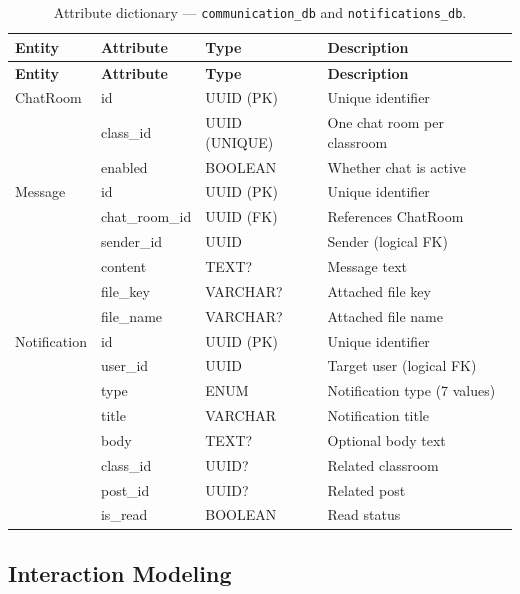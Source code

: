 \begin{longtable}{@{} l l l p{5.5cm} @{}}
  \caption{Attribute dictionary --- \texttt{communication\_db} and \texttt{notifications\_db}.} \label{tab:dict-comm-notif} \\
  \toprule
  \textbf{Entity} & \textbf{Attribute} & \textbf{Type} & \textbf{Description} \\
  \midrule
  \endfirsthead
  \toprule
  \textbf{Entity} & \textbf{Attribute} & \textbf{Type} & \textbf{Description} \\
  \midrule
  \endhead
  ChatRoom & id & UUID (PK) & Unique identifier \\
           & class\_id & UUID (UNIQUE) & One chat room per classroom \\
           & enabled & BOOLEAN & Whether chat is active \\
  \midrule
  Message & id & UUID (PK) & Unique identifier \\
          & chat\_room\_id & UUID (FK) & References ChatRoom \\
          & sender\_id & UUID & Sender (logical FK) \\
          & content & TEXT? & Message text \\
          & file\_key & VARCHAR? & Attached file key \\
          & file\_name & VARCHAR? & Attached file name \\
  \midrule
  Notification & id & UUID (PK) & Unique identifier \\
               & user\_id & UUID & Target user (logical FK) \\
               & type & ENUM & Notification type (7 values) \\
               & title & VARCHAR & Notification title \\
               & body & TEXT? & Optional body text \\
               & class\_id & UUID? & Related classroom \\
               & post\_id & UUID? & Related post \\
               & is\_read & BOOLEAN & Read status \\
  \bottomrule
\end{longtable}

\subsection{Interaction Modeling}
\label{sec:interaction-modeling}

